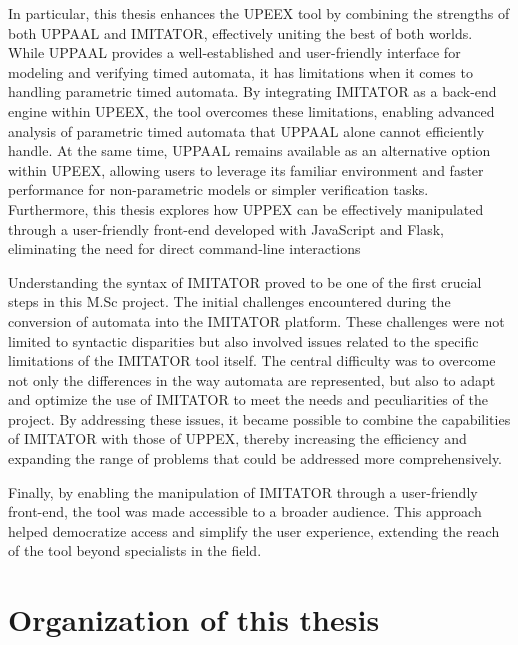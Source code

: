 In particular, this thesis enhances the UPEEX tool by combining the strengths of both UPPAAL and IMITATOR, effectively uniting the best of both worlds. While UPPAAL provides a well-established and user-friendly interface for modeling and verifying timed automata, it has limitations when it comes to handling parametric timed automata. By integrating IMITATOR as a back-end engine within UPEEX, the tool overcomes these limitations, enabling advanced analysis of parametric timed automata that UPPAAL alone cannot efficiently handle. At the same time, UPPAAL remains available as an alternative option within UPEEX, allowing users to leverage its familiar environment and faster performance for non-parametric models or simpler verification tasks. Furthermore, this thesis explores how UPPEX can be effectively manipulated through a user-friendly front-end developed with JavaScript and Flask, eliminating the need for direct command-line interactions

Understanding the syntax of IMITATOR proved to be one of the first crucial steps in this M.Sc project. The initial challenges encountered during the conversion of automata into the IMITATOR platform. These challenges were not limited to syntactic disparities but also involved issues related to the specific limitations of the IMITATOR tool itself. The central difficulty was to overcome not only the differences in the way automata are represented, but also to adapt and optimize the use of IMITATOR to meet the needs and peculiarities of the project. By addressing these issues, it became possible to combine the capabilities of IMITATOR with those of UPPEX, thereby increasing the efficiency and expanding the range of problems that could be addressed more comprehensively.

Finally, by enabling the manipulation of IMITATOR through a user-friendly front-end, the tool was made accessible to a broader audience. This approach helped democratize access and simplify the user experience, extending the reach of the tool beyond specialists in the field.


\section{Organization of this thesis}

